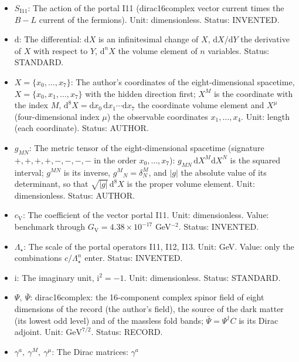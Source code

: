 \documentclass[
  10pt,
]{article}
\providecommand{\tightlist}{%
  \setlength{\itemsep}{0pt}\setlength{\parskip}{0pt}}
\begin{document}
\begin{itemize}
\tightlist
\item
  \(S_{\mathrm{I11}}\): The action of the portal I11 (dirac16complex
  vector current times the \(B - L\) current of the fermions). Unit:
  dimensionless. Status: INVENTED.
\item
  \(\mathrm{d}\): The differential: \(\mathrm{d}X\) is an infinitesimal
  change of \(X\), \(\mathrm{d}X/\mathrm{d}Y\) the derivative of \(X\)
  with respect to \(Y\), \(\mathrm{d}^nX\) the volume element of \(n\)
  variables. Status: STANDARD.
\item
  \(X = \{x_0, \dots, x_7\}\): The author's coordinates of the
  eight-dimensional spacetime, \(X = \{x_0, x_1, \dots, x_7\}\) with the
  hidden direction first; \(X^M\) is the coordinate with the index
  \(M\),
  \(\mathrm{d}^8X = \mathrm{d}x_0\,\mathrm{d}x_1\cdots\mathrm{d}x_7\)
  the coordinate volume element and \(X^\mu\) (four-dimensional index
  \(\mu\)) the observable coordinates \(x_1, \dots, x_4\). Unit: length
  (each coordinate). Status: AUTHOR.
\item
  \(g_{MN}\): The metric tensor of the eight-dimensional spacetime
  (signature \(+,+,+,+,-,-,-,-\) in the order \(x_0, \dots, x_7\)):
  \(g_{MN}\,\mathrm{d}X^M\mathrm{d}X^N\) is the squared interval;
  \(g^{MN}\) is its inverse, \(g^M{}_N = \delta^M_N\), and
  \(\lvert g\rvert\) the absolute value of its determinant, so that
  \(\sqrt{\lvert g\rvert}\,\mathrm{d}^8X\) is the proper volume element.
  Unit: dimensionless. Status: AUTHOR.
\item
  \(c_{\mathrm{V}}\): The coefficient of the vector portal I11. Unit:
  dimensionless. Value: benchmark through
  \(G_{\mathrm{V}} = 4.38\times10^{-17}\) GeV\(^{-2}\). Status:
  INVENTED.
\item
  \(\Lambda_\star\): The scale of the portal operators I11, I12, I13.
  Unit: GeV. Value: only the combinations \(c/\Lambda_\star^n\) enter.
  Status: INVENTED.
\item
  \(\mathrm{i}\): The imaginary unit, \(\mathrm{i}^2 = -1\). Unit:
  dimensionless. Status: STANDARD.
\item
  \(\Psi,\ \bar\Psi\): dirac16complex: the 16-component complex spinor
  field of eight dimensions of the record (the author's field), the
  source of the dark matter (its lowest odd level) and of the massless
  fold bands; \(\bar\Psi = \Psi^\dagger C\) is its Dirac adjoint. Unit:
  \(\mathrm{GeV}^{7/2}\). Status: RECORD.
\item
  \(\gamma^a,\ \gamma^M,\ \gamma^\mu\): The Dirac matrices: \(\gamma^a\)

\end{itemize}
\end{document}
